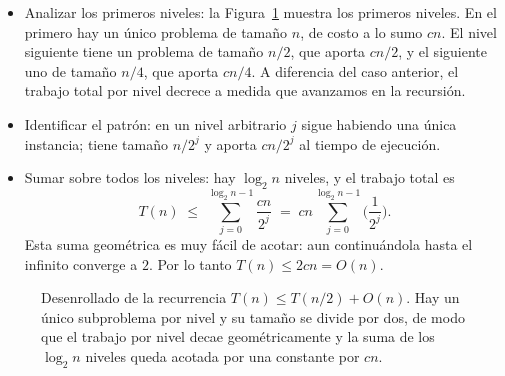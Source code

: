 \documentclass[12pt, spanish, oneside, openany]{book}
\theoremstyle{uprightplain}
\theoremstyle{definition}
\theoremstyle{remark}
\theoremstyle{definition}
\begin{document}
\begin{itemize}
    \item Analizar los primeros niveles: la Figura~\ref{fig:desenrollo-q1} muestra los primeros niveles. En el primero hay un único problema de tamaño $n$, de costo a lo sumo $cn$. El nivel siguiente tiene un problema de tamaño $n/2$, que aporta $cn/2$, y el siguiente uno de tamaño $n/4$, que aporta $cn/4$. A diferencia del caso anterior, el trabajo total por nivel decrece a medida que avanzamos en la recursión.

    \item Identificar el patrón: en un nivel arbitrario $j$ sigue habiendo una única instancia; tiene tamaño $n/2^j$ y aporta $cn/2^j$ al tiempo de ejecución.

    \item Sumar sobre todos los niveles: hay $\log_2 n$ niveles, y el trabajo total es
    \[
    T(n)\;\le\;\sum_{j=0}^{\log_2 n-1}\frac{cn}{2^j}
           \;=\; cn\sum_{j=0}^{\log_2 n-1}\Big(\frac{1}{2^j}\Big).
    \]
    Esta suma geométrica es muy fácil de acotar: aun continuándola hasta el infinito converge a $2$. Por lo tanto $T(n)\le 2cn = O(n)$.
\end{itemize}

\begin{figure}[H]
\centering
{}
\caption{Desenrollado de la recurrencia $T(n)\le T(n/2)+O(n)$. Hay un único
subproblema por nivel y su tamaño se divide por dos, de modo que el trabajo por
nivel decae geométricamente y la suma de los $\log_2 n$ niveles queda acotada
por una constante por $cn$.}
\label{fig:desenrollo-q1}
\end{figure}
\end{document}
